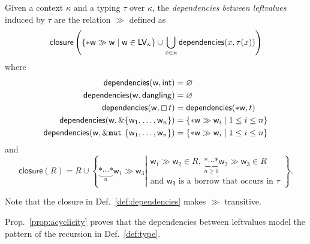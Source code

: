 \begin{definition}\label{def:dependencies}
  Given a context $\kappa$ and a typing $\tau$ over $\kappa$, the \emph{dependencies between leftvalues}
  induced by $\tau$ are the relation $\gg$ defined as
  \[
  \mathsf{closure}\left(\{\mathtt{*}\mathsf{w}\gg\mathsf{w}\mid\mathsf{w}\in\mathsf{LV}_\kappa\}
  \cup\bigcup\limits_{x\in\kappa}\mathsf{dependencies}(x,\tau(x))\right)
  \]
  where
  \begin{align*}
    \mathsf{dependencies}(\mathsf{w},\mathsf{int})&=\varnothing\\
    \mathsf{dependencies}(\mathsf{w},\mathsf{dangling})&=\varnothing\\
    \mathsf{dependencies}(\mathsf{w},\boxempty\,{t})&=\mathsf{dependencies}(\mathtt{*}\mathsf{w},t)\\
    \mathsf{dependencies}(\mathsf{w},\&\{\mathsf{w}_1,\ldots,\mathsf{w}_n\})&=\{\mathtt{*}\mathsf{w}\gg\mathsf{w}_i\mid 1\le i\le n\}\\
    \mathsf{dependencies}(\mathsf{w},\&\mathtt{mut}\ \{\mathsf{w}_1,\ldots,\mathsf{w}_n\})&=\{\mathtt{*}\mathsf{w}\gg\mathsf{w}_i\mid 1\le i\le n\}
  \end{align*}
  and
  \[
  \mathsf{closure}(R)=R\cup\left\{\underbrace{\mathtt{*}\cdots\mathtt{*}}_{n}\mathsf{w}_1\gg\mathsf{w}_3\left|
  \begin{array}{l}
    \mathsf{w}_1\gg\mathsf{w}_2\in R,\ \underbrace{\mathtt{*}\cdots\mathtt{*}}_{n\ge 0}\mathsf{w}_2\gg\mathsf{w}_3\in R\\
    \text{and $\mathsf{w_3}$ is a borrow that occurs in $\tau$}
  \end{array}\right.\right\}.
  \]
\end{definition}

\noindent
Note that the closure in Def.~\ref{def:dependencies} makes $\gg$ transitive.

Prop.~\ref{prop:acyclicity} proves that the dependencies between leftvalues
model the pattern of the recursion in Def.~\ref{def:type}.

